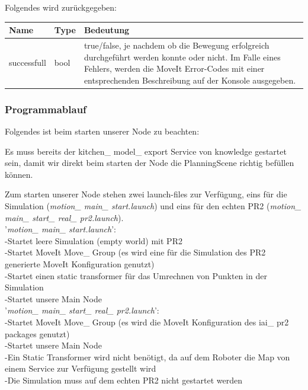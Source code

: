 \documentclass{suturo}
\begin{document}
Folgendes wird zurückgegeben:


\begin{center}
	\begin{tabular}{ l | l | p{10cm}}
		Name & Type & Bedeutung \\ \hline
		successfull & bool & true/false, je nachdem ob die Bewegung erfolgreich durchgeführt werden konnte oder nicht. Im Falle eines Fehlers, werden die MoveIt Error-Codes mit einer entsprechenden Beschreibung auf der Konsole ausgegeben. \\
	\end{tabular}
\end{center}



\subsubsection{Programmablauf}

Folgendes ist beim starten unserer Node zu beachten:

Es muss bereits der kitchen\_ model\_ export Service von knowledge gestartet sein, damit wir direkt beim starten der Node die PlanningScene richtig befüllen können.

Zum starten unserer Node stehen zwei launch-files zur Verfügung, eins für die Simulation (\textit{motion\_ main\_ start.launch}) und eins für den echten PR2 (\textit{motion\_ main\_ start\_ real\_ pr2.launch}).
\\

'\textit{motion\_ main\_ start.launch}': \\
-Startet leere Simulation (empty world) mit PR2 \\
-Startet MoveIt Move\_ Group (es wird eine für die Simulation des PR2 generierte MoveIt Konfiguration genutzt)\\
-Startet einen static transformer für das Umrechnen von Punkten in der Simulation \\
-Startet unsere Main Node \\

\newpage
'\textit{motion\_ main\_ start\_ real\_ pr2.launch}': \\
-Startet MoveIt Move\_ Group (es wird die MoveIt Konfiguration des iai\_ pr2 packages genutzt) \\
-Startet unsere Main Node \\
-Ein Static Transformer wird nicht benötigt, da auf dem Roboter die Map von einem Service zur Verfügung gestellt wird \\
-Die Simulation muss auf dem echten PR2 nicht gestartet werden \\
\end{document}
